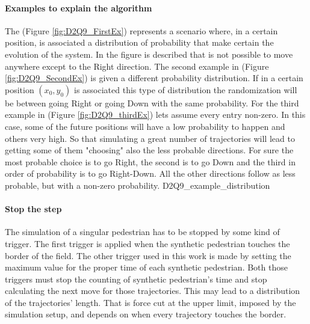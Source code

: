 \documentclass[class=article, crop=false]{standalone}
\begin{document}
\paragraph{Examples to explain the algorithm}
The (Figure \ref{fig:D2Q9_FirstEx}) represents a scenario where, in a certain position, is associated a distribution of probability that make certain the evolution of the system.
In the figure is described that is not possible to move anywhere except to the Right direction.
The second example in (Figure \ref{fig:D2Q9_SecondEx}) is given a different probability distribution.
If in a certain position $(x_0, y_0)$ is associated this type of distribution the randomization will be between going Right or going Down with the same probability.
For the third example in (Figure \ref{fig:D2Q9_thirdEx}) lets assume every entry non-zero.
In this case, some of the future positions will have a low probability to happen and others very high.
So that simulating a great number of trajectories will lead to getting some of them "choosing" also the less probable directions.
For sure the most probable choice is to go Right, the second is to go Down and the third in order of probability is to go Right-Down.
All the other directions follow as less probable, but with a non-zero probability.
	{D2Q9_example_distribution}

\paragraph{Stop the step}
The simulation of a singular pedestrian has to be stopped by some kind of trigger.
The first trigger is applied when the synthetic pedestrian touches the border of the field.
The other trigger used in this work is made by setting the maximum value for the proper time of each synthetic pedestrian.
Both those triggers must stop the counting of synthetic pedestrian's time and stop calculating the next move for those trajectories.
This may lead to a distribution of the trajectories' length.
That is force cut at the upper limit, imposed by the simulation setup, and depends on when every trajectory touches the border.


\FloatBarrier
\end{document}
